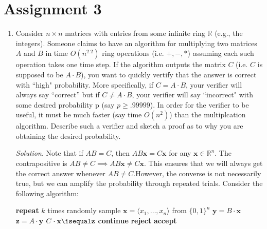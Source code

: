 \documentclass[11pt]{article}
\def\R {{\mathbb R}}
\begin{document}
\section*{Assignment 3}

\begin{enumerate}[leftmargin=16pt]
    \item Consider $n \times n$ matrices with entries from some infinite ring $\R$ (e.g., the integers). Someone claims to have an algorithm for multiplying two matrices $A$ and $B$ in time $O(n^{2.2})$ ring operations (i.e. $+, -, *$) assuming each such operation takes one time step. If the algorithm outputs the matrix $C$ (i.e. $C$ is supposed to be $A \cdot B$), you want to quickly vertify that the answer is correct with ``high" probability. More specifically, if $C = A \cdot B$, your verifier will always say ``correct'' but if $C \neq A \cdot B$, your verifier will say ``incorrect" with some desired probability p (say $p \geq .99999$). In order for the verifier to be useful, it must be much faster (say time $O(n^2)$) than the multiplcation algorithm. Describe such a verifier and sketch a proof as to why you are obtaining
    the desired probability.
    
    \textit{Solution}. Note that if $AB = C$, then $AB\mathbf{x} = C\mathbf{x}$ for any $\mathbf{x} \in \R^n$. The contrapositive is $AB \neq C \implies AB\mathbf{x} \neq C \mathbf{x}$. This ensures that we will always get the correct answer whenever $AB \neq C$.However, the converse is not necessarily true, but we can amplify the probability through repeated trials. Consider the following algorithm:

    \begin{codebox}
        \li \textbf{repeat} $k$ times \Do
            \li randomly sample $\mathbf{x} = \langle x_1,\ldots,x_n \rangle$ from $\{0,1\}^n$
            \li $\mathbf{y} = B \cdot \mathbf{x}$
            \li $\mathbf{z} = A \cdot \mathbf{y}$
            \li \If $C \cdot \mathbf{x} \isequal \mathbf{z}$ \Then
                \li \textbf{continue}
            \li \Else \textbf{reject}
            \End
        \End
        \li \textbf{accept}
    \end{codebox}


\end{enumerate}
\end{document}
